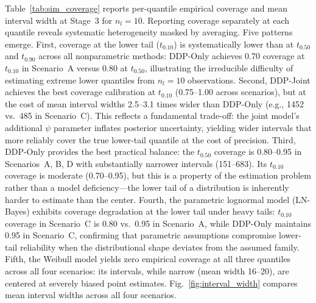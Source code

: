 \documentclass[a4paper,fleqn,longmktitle]{cas-sc}
\begin{document}
Table~\ref{tab:sim_coverage} reports per-quantile empirical coverage and mean interval width at Stage~3 for $n_l = 10$. Reporting coverage separately at each quantile reveals systematic heterogeneity masked by averaging. Five patterns emerge. First, coverage at the lower tail ($t_{0.10}$) is systematically lower than at $t_{0.50}$ and $t_{0.90}$ across all nonparametric methods: DDP-Only achieves 0.70 coverage at $t_{0.10}$ in Scenario~A versus 0.80 at $t_{0.50}$, illustrating the irreducible difficulty of estimating extreme lower quantiles from $n_l=10$ observations. Second, DDP-Joint achieves the best coverage calibration at $t_{0.10}$ (0.75--1.00 across scenarios), but at the cost of mean interval widths 2.5--3.1 times wider than DDP-Only (e.g., 1452 vs.\ 485 in Scenario~C). This reflects a fundamental trade-off: the joint model's additional $\psi$ parameter inflates posterior uncertainty, yielding wider intervals that more reliably cover the true lower-tail quantile at the cost of precision. Third, DDP-Only provides the best practical balance: the $t_{0.50}$ coverage is 0.80--0.95 in Scenarios~A, B, D with substantially narrower intervals (151--683). Its $t_{0.10}$ coverage is moderate (0.70--0.95), but this is a property of the estimation problem rather than a model deficiency---the lower tail of a distribution is inherently harder to estimate than the center. Fourth, the parametric lognormal model (LN-Bayes) exhibits coverage degradation at the lower tail under heavy tails: $t_{0.10}$ coverage in Scenario~C is 0.80 vs.\ 0.95 in Scenario~A, while DDP-Only maintains 0.95 in Scenario~C, confirming that parametric assumptions compromise lower-tail reliability when the distributional shape deviates from the assumed family. Fifth, the Weibull model yields zero empirical coverage at all three quantiles across all four scenarios: its intervals, while narrow (mean width 16--20), are centered at severely biased point estimates. Fig.~\ref{fig:interval_width} compares mean interval widths across all four scenarios.
\end{document}
